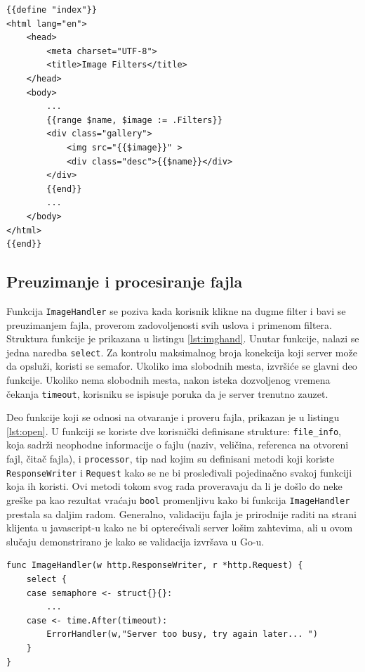 \documentclass[12pt,oneside]{memoir}
\begin{document}
\begin{center}
\begin{lstlisting}[caption=Primer HTML šablona,label={lst:tmpl2},  backgroundcolor=\color{background}]
{{define "index"}}
<html lang="en">
	<head>
		<meta charset="UTF-8">
		<title>Image Filters</title>
	</head>
	<body>
		...
		{{range $name, $image := .Filters}}
		<div class="gallery">
			<img src="{{$image}}" >
			<div class="desc">{{$name}}</div>
		</div>
		{{end}}
		...
	</body>
</html>
{{end}}
\end{lstlisting}
\end{center}

\subsection{Preuzimanje i procesiranje fajla}\label{appFile}

Funkcija \texttt{ImageHandler} se poziva kada korisnik klikne na dugme filter i bavi se preuzimanjem fajla, proverom zadovoljenosti svih uslova i primenom filtera. Struktura funkcije je prikazana u listingu \ref{lst:imghand}. Unutar funkcije, nalazi se jedna naredba \texttt{select}. Za kontrolu maksimalnog broja konekcija koji server može da opsluži, koristi se semafor. Ukoliko ima slobodnih mesta, izvršiće se glavni deo funkcije. Ukoliko nema slobodnih mesta, nakon isteka dozvoljenog vremena čekanja \texttt{timeout}, korisniku se ispisuje poruka da je server trenutno zauzet. 
 
Deo funkcije koji se odnosi na otvaranje i proveru fajla, prikazan je u listingu \ref{lst:open}. U funkciji se koriste dve korisnički definisane strukture: \texttt{file\_info}, koja sadrži neophodne informacije o fajlu (naziv, veličina, referenca na otvoreni fajl, čitač fajla), i \texttt{processor}, tip nad kojim su definisani metodi koji koriste \texttt{ResponseWriter} i \texttt{Request} kako se ne bi prosleđivali pojedinačno svakoj funkciji koja ih koristi. Ovi metodi tokom svog rada proveravaju da li je došlo do neke greške pa kao rezultat vraćaju \texttt{bool} promenljivu kako bi funkcija \texttt{ImageHandler} prestala sa daljim radom. Generalno, validaciju fajla je prirodnije raditi na strani klijenta u javascript-u kako ne bi opterećivali server lošim zahtevima, ali u ovom slučaju demonstrirano je kako se validacija izvršava u Go-u.

\begin{center}
\begin{lstlisting}[caption=Struktura funkcije ImageHandler,label={lst:imghand},  backgroundcolor=\color{background}]
func ImageHandler(w http.ResponseWriter, r *http.Request) {
	select {
	case semaphore <- struct{}{}:
		...
	case <- time.After(timeout):
		ErrorHandler(w,"Server too busy, try again later... ")
	}
}

\end{lstlisting}
\end{center}
\end{document}
